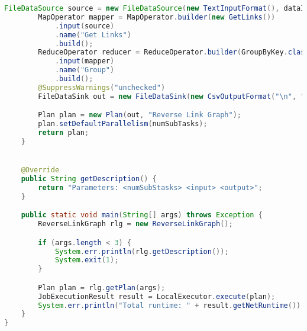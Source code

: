 \begin{lstlisting}[language=java]
		FileDataSource source = new FileDataSource(new TextInputFormat(), dataInput, "Input Data");
		MapOperator mapper = MapOperator.builder(new GetLinks())
			.input(source)
			.name("Get Links")
			.build();
		ReduceOperator reducer = ReduceOperator.builder(GroupByKey.class, StringValue.class, 0)
			.input(mapper)
			.name("Group")
			.build();
		@SuppressWarnings("unchecked")
		FileDataSink out = new FileDataSink(new CsvOutputFormat("\n", ",", StringValue.class, StringValue.class), output, reducer, "Reverse Link Graph");

		Plan plan = new Plan(out, "Reverse Link Graph");
		plan.setDefaultParallelism(numSubTasks);
		return plan;
	}


	@Override
	public String getDescription() {
		return "Parameters: <numSubStasks> <input> <output>";
	}

	public static void main(String[] args) throws Exception {
		ReverseLinkGraph rlg = new ReverseLinkGraph();

		if (args.length < 3) {
			System.err.println(rlg.getDescription());
			System.exit(1);
		}

		Plan plan = rlg.getPlan(args);
		JobExecutionResult result = LocalExecutor.execute(plan);
		System.err.println("Total runtime: " + result.getNetRuntime());
	}
}
\end{lstlisting}